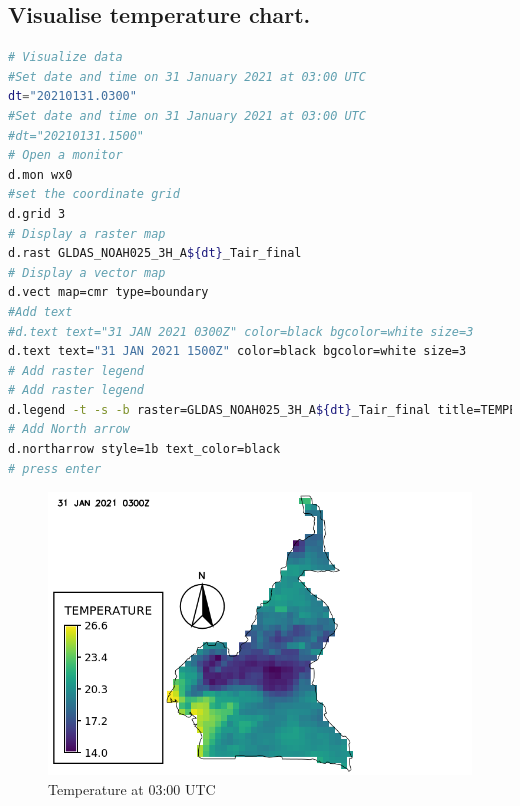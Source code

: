 \subsection{Visualise temperature chart.}
\begin{lstlisting}[language=Bash]
# Visualize data
#Set date and time on 31 January 2021 at 03:00 UTC
dt="20210131.0300"
#Set date and time on 31 January 2021 at 03:00 UTC
#dt="20210131.1500"
# Open a monitor
d.mon wx0
#set the coordinate grid
d.grid 3
# Display a raster map
d.rast GLDAS_NOAH025_3H_A${dt}_Tair_final
# Display a vector map
d.vect map=cmr type=boundary
#Add text
#d.text text="31 JAN 2021 0300Z" color=black bgcolor=white size=3
d.text text="31 JAN 2021 1500Z" color=black bgcolor=white size=3
# Add raster legend
# Add raster legend
d.legend -t -s -b raster=GLDAS_NOAH025_3H_A${dt}_Tair_final title=TEMPERATURE title_fontsize=20 font=sans fontsize=18
# Add North arrow
d.northarrow style=1b text_color=black
# press enter
\end{lstlisting}
\begin{figure}[H]
\begin{center}
\includegraphics[scale=0.6]{tp03.png} %
\end{center}

\caption{Temperature at 03:00 UTC}
\label{Temperature at 03:00 UTC}%
\end{figure}

